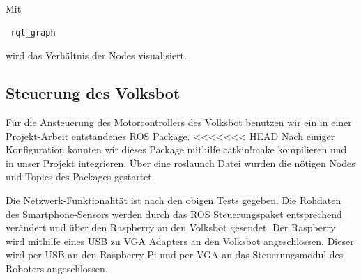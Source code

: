 \documentclass[12pt]{article}
\begin{document}
Mit 

 \begin{lstlisting}
 rqt_graph 
 \end{lstlisting}

wird das Verhältnis der Nodes visualisiert.




	

\subsection{Steuerung des Volksbot}

Für die Ansteuerung des Motorcontrollers des Volksbot benutzen wir ein in einer Projekt-Arbeit entstandenes ROS Package.
<<<<<<< HEAD
Nach einiger Konfiguration konnten wir dieses Package mithilfe catkin!make kompilieren und in unser Projekt integrieren.
Über eine roslaunch Datei wurden die nötigen Nodes und Topics des Packages gestartet.

Die Netzwerk-Funktionalität ist nach den obigen Tests gegeben.
Die Rohdaten des Smartphone-Sensors werden durch das ROS Steuerungspaket entsprechend verändert und über den Raspberry an den Volksbot gesendet.
Der Raspberry wird mithilfe eines USB zu VGA Adapters an den Volksbot angeschlossen. Dieser wird per USB an den Raspberry Pi und per VGA an das Steuerungsmodul des Roboters angeschlossen.






\end{document}
